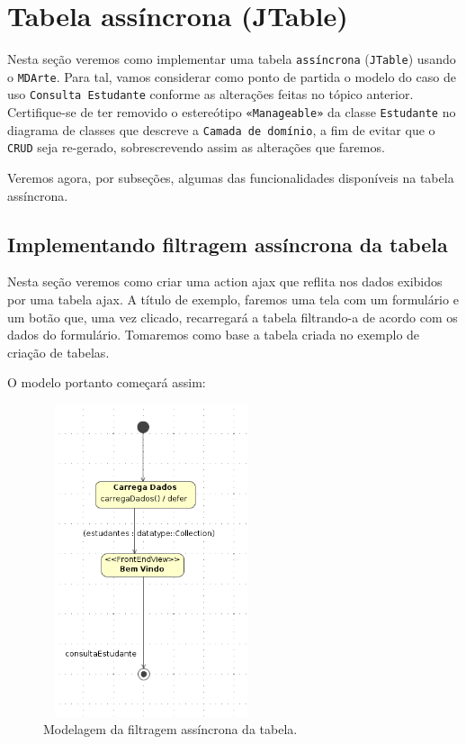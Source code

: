 \section{Tabela assíncrona (JTable)}

Nesta seção veremos como implementar uma tabela \texttt{assíncrona}
(\texttt{JTable}) usando o \texttt{MDArte}. Para tal, vamos considerar como
ponto de partida o modelo do caso de uso \texttt{Consulta Estudante} conforme as
alterações feitas no tópico anterior. Certifique-se de ter removido o
estereótipo \texttt{«Manageable»} da classe \texttt{Estudante} no diagrama de
classes que descreve a \texttt{Camada de domínio}, a fim de evitar que o
\texttt{CRUD} seja re-gerado, sobrescrevendo assim as alterações que faremos.

Veremos agora, por subseções, algumas das funcionalidades disponíveis na tabela
assíncrona.

\subsection{Implementando filtragem assíncrona da tabela}
Nesta seção veremos como criar uma action ajax que reflita nos dados exibidos
por uma tabela ajax. A título de exemplo, faremos uma tela com um formulário e
um botão que, uma vez clicado, recarregará a tabela filtrando-a de acordo com os
dados do formulário. Tomaremos como base a tabela criada no exemplo de criação
de tabelas.

O modelo portanto começará assim:

\begin{figure}[H]
	\centering
	\includegraphics[width=180pt,height=260pt]{files/imgs/tutorial-mdarte-0040.png}
	\caption{Modelagem da filtragem assíncrona da tabela.}
	\label{modelando_filtragem_assincrona}
\end{figure}

